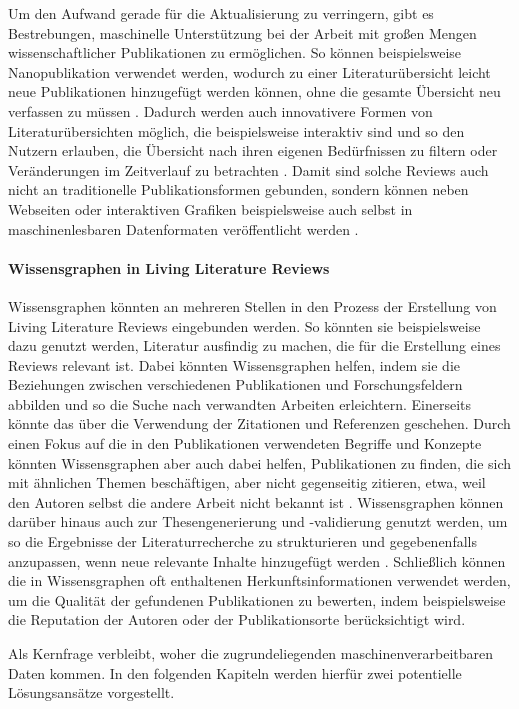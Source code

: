 Um den Aufwand \textemdash gerade für die Aktualisierung \textemdash zu verringern, gibt es Bestrebungen, maschinelle Unterstützung bei der Arbeit mit großen Mengen wissenschaftlicher Publikationen zu ermöglichen.
So können beispielsweise Nanopublikation \cite{nanopubs} verwendet werden, wodurch zu einer Literaturübersicht leicht neue Publikationen hinzugefügt werden können, ohne die gesamte Übersicht neu verfassen zu müssen \cite{living-lit-review}.
Dadurch werden auch innovativere Formen von Literaturübersichten möglich, die beispielsweise interaktiv sind und so den Nutzern erlauben, die Übersicht nach ihren eigenen Bedürfnissen zu filtern oder Veränderungen im Zeitverlauf zu betrachten \cite{living-lit-review}.
Damit sind solche Reviews auch nicht an traditionelle Publikationsformen gebunden, sondern können neben Webseiten oder interaktiven Grafiken beispielsweise auch selbst in maschinenlesbaren Datenformaten veröffentlicht werden \cite{linked-lit-review}.


\paragraph{Wissensgraphen in Living Literature Reviews}

Wissensgraphen könnten an mehreren Stellen in den Prozess der Erstellung von Living Literature Reviews eingebunden werden.
So könnten sie beispielsweise dazu genutzt werden, Literatur ausfindig zu machen, die für die Erstellung eines Reviews relevant ist.
Dabei könnten Wissensgraphen helfen, indem sie die Beziehungen zwischen verschiedenen Publikationen und Forschungsfeldern abbilden und so die Suche nach verwandten Arbeiten erleichtern.
Einerseits könnte das über die Verwendung der Zitationen und Referenzen geschehen.
Durch einen Fokus auf die in den Publikationen verwendeten Begriffe und Konzepte könnten Wissensgraphen aber auch dabei helfen, Publikationen zu finden, die sich mit ähnlichen Themen beschäftigen, aber nicht gegenseitig zitieren, etwa, weil den Autoren selbst die andere Arbeit nicht bekannt ist \cite{citation-recommendation}.
Wissensgraphen können darüber hinaus auch zur Thesengenerierung und -validierung genutzt werden, um so die Ergebnisse der Literaturrecherche zu strukturieren und gegebenenfalls anzupassen, wenn neue relevante Inhalte hinzugefügt werden \cite{DESSI2022109945}.
Schließlich können die in Wissensgraphen oft enthaltenen Herkunftsinformationen verwendet werden, um die Qualität der gefundenen Publikationen zu bewerten, indem beispielsweise die Reputation der Autoren oder der Publikationsorte berücksichtigt wird.

Als Kernfrage verbleibt, woher die zugrundeliegenden maschinenverarbeitbaren Daten kommen.
In den folgenden Kapiteln werden hierfür zwei potentielle Lösungsansätze vorgestellt.